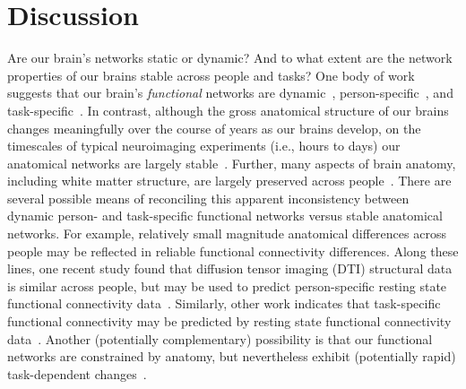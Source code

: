 \documentclass[11pt]{article}
\begin{document}
\section*{Discussion}
Are our brain's networks static or dynamic?  And to what
extent are the network properties of our brains stable across people and tasks?
One body of work suggests that our brain's \textit{functional} networks are
dynamic~\citep[e.g., ][]{MannEtal18}, person-specific~\citep[e.g.,
][]{FinnEtal15}, and task-specific~\citep[e.g., ][]{Turk13}.  In contrast,
although the gross anatomical structure of our brains changes meaningfully over
the course of years as our brains develop, on the timescales of typical
neuroimaging experiments (i.e., hours to days) our anatomical networks are
largely stable~\citep[e.g., ][]{CaseEtal00}.  Further, many aspects of brain
anatomy, including white matter structure, are largely preserved across
people~\citep[e.g., ][]{TalaTour88, JahaEtal13, MoriEtal08}. There are several
possible means of reconciling this apparent inconsistency between dynamic
person- and task-specific functional networks versus stable anatomical networks.
For example, relatively small magnitude anatomical differences across people may
be reflected in reliable functional connectivity differences.  Along these
lines, one recent study found that diffusion tensor imaging (DTI) structural
data is similar across people, but may be used to predict person-specific
resting state functional connectivity data~\citep{BeckEtal18}.  Similarly, other
work indicates that task-specific functional connectivity may be predicted by
resting state functional connectivity data~\citep{ColeEtal16, TavoEtal16}.
Another (potentially complementary) possibility is that our functional networks
are constrained by anatomy, but nevertheless exhibit (potentially rapid)
task-dependent changes~\citep[e.g., ][]{SporBetz16}.
\end{document}
